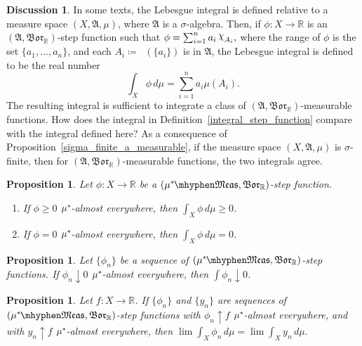 \documentclass[
twoside=true,
paper=letter,
fontsize=9pt,
pagesize=auto,
leqno,
openany,
headsepline,
overfullrule,
]{scrbook}
\theoremstyle{plain}
\theoremstyle{plain}
\newtheorem{prop}[thm]{Proposition}
\theoremstyle{definition}
\newtheorem{discussion}[thm]{Discussion}
\theoremstyle{bfnoteitalic}
\theoremstyle{bfnoteroman}
\newcommand{\sigalg}[1]{\mathfrak{#1}}
\newcommand{\definedby}{\coloneqq}
\newcommand{\borel}{\mathfrak{Bor}}
\newcommand{\textsigma}{\hbox{\large{$\sigma$}}\kern-1pt}
\newcommand{\charfunction}[1]{\mathop{{\raisebox{2pt}{$\chi$}}_{#1}}}
\newcommand{\preimage}[1]{\mathop{#1^{\leftarrow}}}
\newcommand{\R}{\mathbb{R}}
\newcommand{\sigmaalgebra}{\sigalg{A}}
\newcommand{\measurable}[1]{{#1}\mhyphen\mathfrak{Meas}}
\newcommand{\kernast}{\ast\kern-1pt}
\newcommand{\measurespace}{X}
\newcommand{\mspaceeltii}{y}
\newcommand{\measure}{\mu}
\newcommand{\measmu}{\mu}
\begin{document}
\begin{discussion}\label{alternate_lebesgue_integral}
In some texts, the Lebesgue integral is defined relative to a measure space
$(\measurespace, \sigmaalgebra, \measure)$,
where $\sigmaalgebra$ is a \textsigma\hyp{}algebra.
Then, if
$\phi:\measurespace\to\R$ is an
$(\sigmaalgebra,\borel_\R)$-step function such that $\phi=\sum_{i=1}^{n}a_i\charfunction{A_i},$ where the range of $\phi$ is the set $\{a_1, \ldots, a_n\}$, and each
$A_i \definedby \preimage{\phi}(\{ a_i\} )$
is in $\sigmaalgebra$,
the Lebesgue integral is defined to be the real number
\[
\int_\measurespace\phi\,d\measure = \sum_{i=1}^{n}a_i\measmu(A_i).
\]
The resulting integral is sufficient to integrate a class of
$(\sigmaalgebra, \borel_\R)$\hyp{}measurable functions.
How does the integral in Definition~\ref{integral_step_function} compare with the integral defined here?
As a consequence of Proposition~\ref{sigma_finite_a_measurable}, if the measure space
$(\measurespace, \sigmaalgebra, \measmu)$ is \textsigma\hyp{}finite, then for
$(\sigmaalgebra, \borel_\R)$\hyp{}measurable functions, the two integrals agree.
\end{discussion}




\begin{prop}
Let $\phi:\measurespace\to\R$ be a $(\measurable{\measure^\kernast},\borel_\R)$-step function.
\begin{enumerate}
\item
If $\phi \geq 0$ $\measure^\kernast$-almost everywhere, then 
$\int_\measurespace\phi\,d\measure \geq 0$.
\item
If $\phi = 0$ $\measure^\kernast$-almost everywhere, then 
$\int_\measurespace\phi\,d\measure = 0$.
\end{enumerate}
\end{prop}


\begin{prop}\label{continuity_at_zero}
Let $\{\phi_n\}$ be a sequence of $(\measurable{\measure^\kernast},\borel_\R)$-step functions.  If $\phi_n\downarrow 0$ $\measure^\kernast$-almost everywhere, then $\int \phi_n\downarrow 0$.
\end{prop}



\begin{prop}\label{integral_is_unique}
Let $f:\measurespace\to\R$. If $\{\phi_n\}$ and $\{\mspaceeltii_n\}$ are sequences of $(\measurable{\measure^\kernast},\borel_\R)$-step functions with 
$\phi_n\uparrow f$ $\measure^\kernast$-almost everywhere, and with 
$\mspaceeltii_n\uparrow f$ $\measure^\kernast$-almost everywhere,
then 
$\lim \int_\measurespace\phi_n\,d\measure 
=
\lim \int_\measurespace\mspaceeltii_n\,d\measure.$
\end{prop}
\end{document}
